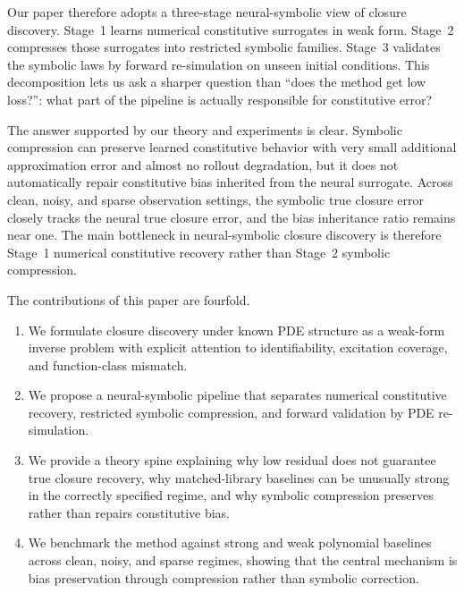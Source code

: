 Our paper therefore adopts a three-stage neural-symbolic view of closure discovery. Stage~1 learns numerical constitutive surrogates in weak form. Stage~2 compresses those surrogates into restricted symbolic families. Stage~3 validates the symbolic laws by forward re-simulation on unseen initial conditions. This decomposition lets us ask a sharper question than ``does the method get low loss?'': what part of the pipeline is actually responsible for constitutive error?

The answer supported by our theory and experiments is clear. Symbolic compression can preserve learned constitutive behavior with very small additional approximation error and almost no rollout degradation, but it does not automatically repair constitutive bias inherited from the neural surrogate. Across clean, noisy, and sparse observation settings, the symbolic true closure error closely tracks the neural true closure error, and the bias inheritance ratio remains near one. The main bottleneck in neural-symbolic closure discovery is therefore Stage~1 numerical constitutive recovery rather than Stage~2 symbolic compression.

The contributions of this paper are fourfold.
\begin{enumerate}[leftmargin=1.5em]
\item We formulate closure discovery under known PDE structure as a weak-form inverse problem with explicit attention to identifiability, excitation coverage, and function-class mismatch.
\item We propose a neural-symbolic pipeline that separates numerical constitutive recovery, restricted symbolic compression, and forward validation by PDE re-simulation.
\item We provide a theory spine explaining why low residual does not guarantee true closure recovery, why matched-library baselines can be unusually strong in the correctly specified regime, and why symbolic compression preserves rather than repairs constitutive bias.
\item We benchmark the method against strong and weak polynomial baselines across clean, noisy, and sparse regimes, showing that the central mechanism is bias preservation through compression rather than symbolic correction.
\end{enumerate}
